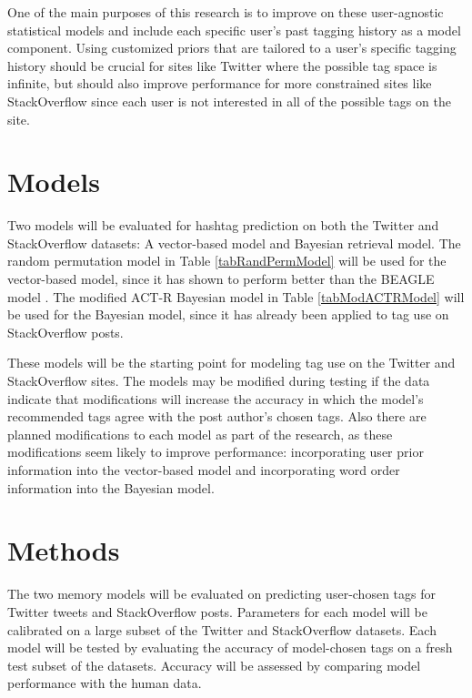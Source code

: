 \documentclass[man,floatsintext,donotrepeattitle]{apa6}
\begin{document}
One of the main purposes of this research is to improve on these user-agnostic statistical models and include each specific user's past tagging history as a model component.
Using customized priors that are tailored to a user's specific tagging history should be crucial for sites like Twitter where the possible tag space is infinite,
but should also improve performance for more constrained sites like StackOverflow since each user is not interested in all of the possible tags on the site. 

\section{Models}

Two models will be evaluated for hashtag prediction on both the Twitter and StackOverflow datasets:
A vector-based model and Bayesian retrieval model.
The random permutation model \parencite{Sahlgren2008} in Table \ref{tabRandPermModel} will be used for the vector-based model, since it has shown to perform better than the BEAGLE model \parencite{Recchia2010}.
The modified ACT-R Bayesian model \parencite{Stanley2013} in Table \ref{tabModACTRModel} will be used for the Bayesian model, since it has already been applied to tag use on StackOverflow posts.

These models will be the starting point for modeling tag use on the Twitter and StackOverflow sites.
The models may be modified during testing if the data indicate that modifications will increase the accuracy in which the model's recommended tags agree with the post author's chosen tags.
Also there are planned modifications to each model as part of the research, as these modifications seem likely to improve performance: 
incorporating user prior information into the vector-based model and incorporating word order information into the Bayesian model.

\section{Methods}

The two memory models will be evaluated on predicting user-chosen tags for Twitter tweets and StackOverflow posts.
Parameters for each model will be calibrated on a large subset of the Twitter and StackOverflow datasets.
Each model will be tested by evaluating the accuracy of model-chosen tags on a fresh test subset of the datasets.
Accuracy will be assessed by comparing model performance with the human data.
\end{document}
